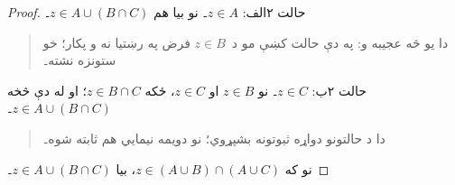 \documentclass[../../../include/open-logic-section]{subfiles}
\begin{document}
\begin{proof}
حالت ۲الف: $z \in A$۔
نو بيا هم $z \in A \cup (B \cap C)$۔
\begin{quote}
دا يو څه عجيبه و: په دې
حالت کښې مو د~$z \in B$
فرض په رښتيا نه و پکار؛
خو ستونزه نشته۔
\end{quote}
حالت ۲ب: $z \in C$۔
نو $z \in B$ او
$z \in C$، ځکه
$z \in B \cap C$؛
او له دې څخه
$z \in A \cup (B \cap C)$۔
\begin{quote}
دا د حالتونو دواړه
ثبوتونه بشپړوي؛ نو
دويمه نيمايي هم
ثابته شوه۔
\end{quote}
نو که
$z \in (A \cup B) \cap (A \cup C)$،
بيا $z \in A \cup (B \cap C)$۔
\end{proof}
\end{document}
